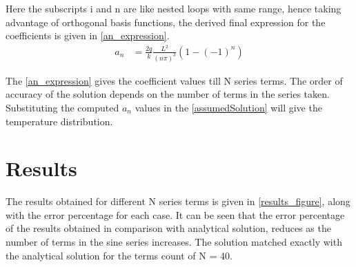 \documentclass[conf]{new-aiaa}
\begin{document}
\par Here the subscripts i and n are like nested loops with same range, hence taking advantage of orthogonal basis
functions, the derived final expression for the coefficients is given in \cref{an_expression}.
\begin{align}
    a_n &= \frac{2 q}{k} \frac{L^2}{\left(n \pi\right)^3} \left(1 - \left(-1\right)^n\right) \label{an_expression}
\end{align}

\par The \cref{an_expression} gives the coefficient values till N series terms.
The order of accuracy of the solution depends on the number of terms in the
series taken. Substituting the computed $a_n$ values in the \cref{assumedSolution}
will give the temperature distribution.

\section{Results}
\par The results obtained for different N series terms is given in \cref{results_figure},
along with the error percentage for each case. It can be seen that the
error percentage of the results obtained in comparison with analytical solution,
reduces as the number of terms in the sine series increases. The solution
matched exactly with the analytical solution for the terms count of N = 40.
\end{document}
